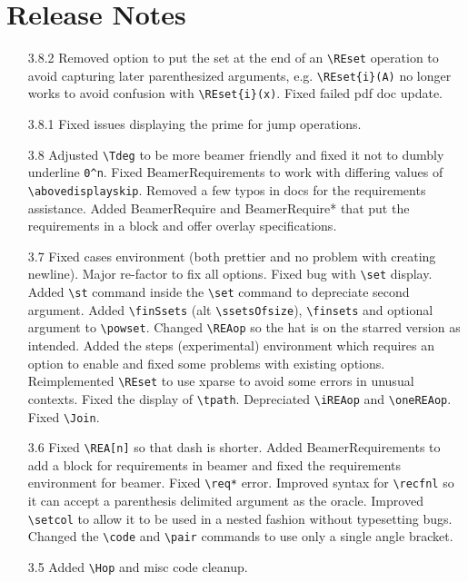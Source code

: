 \documentclass[leqno,11pt]{amsart}
\begin{document}
\section{Release Notes}


\begin{itemize}
	\item[3.8.2] Removed option to put the set at the end of an \verb=\REset= operation to avoid capturing later parenthesized arguments, e.g. \verb=\REset{i}(A)= no longer works to avoid confusion with \verb=\REset{i}(x)=.  Fixed failed pdf doc update.
	\item[3.8.1] Fixed issues displaying the prime for jump operations.
	\item[3.8] Adjusted \verb=\Tdeg= to be more beamer friendly and fixed it not to dumbly underline \verb=0^n=.  Fixed BeamerRequirements to work with differing values of \verb=\abovedisplayskip=.  Removed a few typos in docs for the requirements assistance.  Added BeamerRequire and BeamerRequire* that put the requirements in a block and offer overlay specifications.
	\item[3.7] Fixed cases environment (both prettier and no problem with creating newline).  Major re-factor to fix all options.  Fixed bug with \verb=\set= display.  Added \verb=\st= command inside the \verb=\set= command to depreciate second argument.  Added \verb=\finSsets= (alt \verb=\ssetsOfsize=), \verb=\finsets= and optional argument to \verb=\powset=.  Changed \verb=\REAop= so the hat is on the starred version as intended.  Added the steps (experimental) environment which requires an option to enable and fixed some problems with existing options.  Reimplemented \verb=\REset= to use xparse to avoid some errors in unusual contexts.  Fixed the display of \verb=\tpath=.   Depreciated \verb=\iREAop= and \verb=\oneREAop=.  Fixed \verb=\Join=.
	\item[3.6] Fixed \verb=\REA[n]= so that dash is shorter.  Added BeamerRequirements to add a block for requirements in beamer and fixed the requirements environment for beamer.  Fixed \verb=\req*= error.  Improved syntax for \verb=\recfnl= so it can accept a parenthesis delimited argument as the oracle.  Improved \verb=\setcol= to allow it to be used in a nested fashion without typesetting bugs.  Changed the \verb=\code= and \verb=\pair= commands to use only a single angle bracket.
	\item[3.5] Added \verb=\Hop= and misc code cleanup.

\end{itemize}
\end{document}
